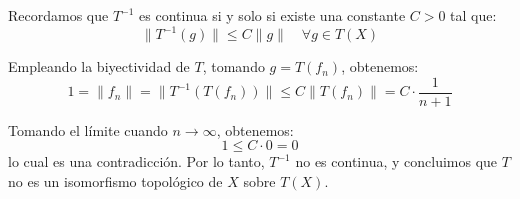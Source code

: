 \documentclass[12pt]{article}
\begin{document}
\begin{ejercicio}[4 puntos]
\begin{enumerate}[label=\alph*)]
            Recordamos que $T^{-1}$ es continua si y solo si existe una constante $C>0$ tal que:
            \begin{equation*}
                \|T^{-1}(g)\| \leq C\|g\| \quad \forall g \in T(X)
            \end{equation*}

            Empleando la biyectividad de $T$, tomando $g=T(f_n)$, obtenemos:
            \begin{equation*}
                1 = \|f_n\| = \|T^{-1}(T(f_n))\| \leq C\|T(f_n)\| = C\cdot \frac{1}{n+1}
            \end{equation*}

            Tomando el límite cuando $n\to \infty$, obtenemos:
            \begin{equation*}
                1 \leq C \cdot 0 = 0
            \end{equation*}
            lo cual es una contradicción. Por lo tanto, $T^{-1}$ no es continua, y concluimos que $T$ no es un isomorfismo topológico de $X$ sobre $T(X)$.
        \end{enumerate}
    \end{ejercicio}
\end{document}
